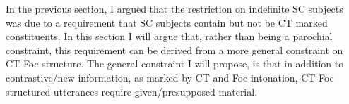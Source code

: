 \documentclass[GPFinal]{subfiles}
\begin{document}
In the previous section, I argued that the restriction on indefinite SC subjects was due to a requirement that SC subjects contain but not be CT marked constituents.
In this section I will argue that, rather than being a parochial constraint, this requirement can be derived from a more general constraint on CT-Foc structure.
The general constraint I will propose, is that in addition to contrastive/new information, as marked by CT and Foc intonation, CT-Foc structured utterances require given/presupposed material.
\end{document}
